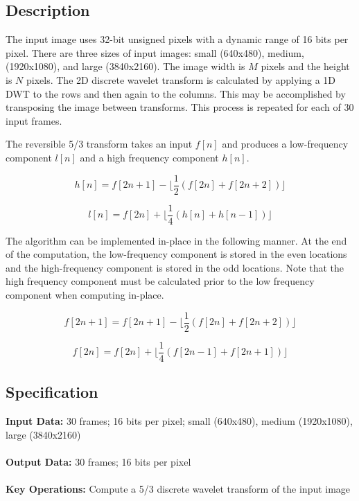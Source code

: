 \documentclass{report}
\begin{document}
\subsection{Description}

The input image uses 32-bit unsigned pixels with a dynamic range of 16 bits per
pixel.
There are three sizes of input images: small (640x480), medium, (1920x1080),
and large (3840x2160).
The image width is $M$ pixels and the height is $N$ pixels.
The 2D discrete wavelet transform is calculated by applying a 1D
DWT to the rows and then again to the columns.  This may be accomplished by
transposing the image between transforms.
This process is repeated for each of 30 input frames.

The reversible 5/3 transform takes an input $f[n]$ and produces a low-frequency
component $l[n]$ and a high frequency component $h[n]$.

\begin{equation}
 h[n] = f[2n+1] - \lfloor \frac{1}{2} (f[2n] + f[2n+2]) \rfloor
\end{equation}

\begin{equation}
 l[n] = f[2n] + \lfloor \frac{1}{4} (h[n] + h[n-1]) \rfloor
\end{equation}

The algorithm can be implemented in-place in the following manner.  At the end
of the computation, the low-frequency component is stored in the even locations
and the high-frequency component is stored in the odd locations.  Note that the
high frequency component must be calculated prior to the low frequency component
when computing in-place.

\begin{equation}
 f[2n+1] = f[2n+1] - \lfloor \frac{1}{2} (f[2n] + f[2n+2]) \rfloor
\end{equation}

\begin{equation}
 f[2n] = f[2n] + \lfloor \frac{1}{4} (f[2n-1] + f[2n+1]) \rfloor
\end{equation}

\subsection{Specification}

\textbf{Input Data:}  30 frames; 16 bits per pixel; small (640x480), medium (1920x1080), large (3840x2160) \\ \\
\textbf{Output Data:}   30 frames; 16 bits per pixel \\ \\
\textbf{Key Operations:}  Compute a 5/3 discrete wavelet transform of the input
  image
\end{document}
